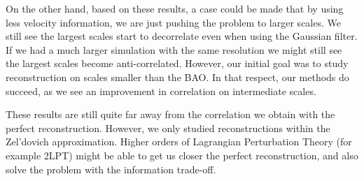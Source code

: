 On the other hand, based on these results, a case could be made that by using less velocity information, we are just pushing the problem to larger scales. We still see the largest scales start to decorrelate even when using the Gaussian filter. If we had a much larger simulation with the same resolution we might still see the largest scales become anti-correlated. However, our initial goal was to study reconstruction on scales smaller than the BAO. In that respect, our methods do succeed, as we see an improvement in correlation on intermediate scales.

These results are still quite far away from the correlation we obtain with the perfect reconstruction. However, we only studied reconstructions within the Zel'dovich approximation. Higher orders of Lagrangian Perturbation Theory (for example 2LPT) might be able to get us closer the perfect reconstruction, and also solve the problem with the information trade-off. 

    
    
